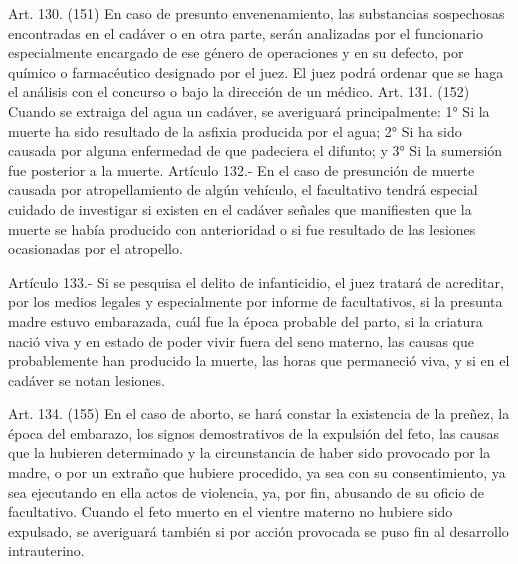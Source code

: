     Art. 130. (151) En caso de presunto envenenamiento, las substancias sospechosas encontradas en el cadáver o en otra parte, serán analizadas por el funcionario especialmente encargado de ese género de operaciones y en su defecto, por químico o farmacéutico designado por el juez.
    El juez podrá ordenar que se haga el análisis con el concurso o bajo la dirección de un médico.
    Art. 131. (152) Cuando se extraiga del agua un cadáver, se averiguará principalmente:
    1° Si la muerte ha sido resultado de la asfixia producida por el agua;
    2° Si ha sido causada por alguna enfermedad de que padeciera el difunto; y
    3° Si la sumersión fue posterior a la muerte.
    Artículo 132.- En el caso de presunción de muerte causada por atropellamiento de algún vehículo, el facultativo tendrá especial cuidado de investigar si existen en el cadáver señales que manifiesten que la muerte se había producido con anterioridad o si fue resultado de las lesiones ocasionadas por el atropello.

    Artículo 133.- Si se pesquisa el delito de infanticidio, el juez tratará de acreditar, por los medios legales y especialmente por informe de facultativos, si la presunta madre estuvo embarazada, cuál fue la época probable del parto, si la criatura nació viva y en estado de poder vivir fuera del seno materno, las causas que probablemente han producido la muerte, las horas que permaneció viva, y si en el cadáver se notan lesiones.

    Art. 134. (155) En el caso de aborto, se hará constar la existencia de la preñez, la época del embarazo, los signos demostrativos de la expulsión del feto, las causas que la hubieren determinado y la circunstancia de haber sido provocado por la madre, o por un extraño que hubiere procedido, ya sea con su consentimiento, ya sea ejecutando en ella actos de violencia, ya, por fin, abusando de su oficio de facultativo.
    Cuando el feto muerto en el vientre materno no hubiere sido expulsado, se averiguará también si por acción provocada se puso fin al desarrollo intrauterino.

